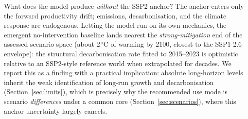 \documentclass[a4paper,fleqn]{cas-sc}
\begin{document}
What does the model produce \emph{without} the SSP2 anchor? The anchor enters only the forward
productivity drift; emissions, decarbonisation, and the climate response are endogenous. Letting
the model run on its own mechanics, the emergent no-intervention baseline lands nearest the
\emph{strong-mitigation} end of the assessed scenario space (about $2\,^\circ$C of warming by
2100, closest to the SSP1-2.6 envelope): the structural decarbonisation rate fitted to 2015--2023
is optimistic relative to an SSP2-style reference world when extrapolated for decades. We report
this as a finding with a practical implication: absolute long-horizon levels inherit the weak
identification of long-run growth and decarbonisation (Section~\ref{sec:limits}), which is
precisely why the recommended use mode is scenario \emph{differences} under a common core
(Section~\ref{sec:scenarios}), where this anchor uncertainty largely cancels.
\end{document}
